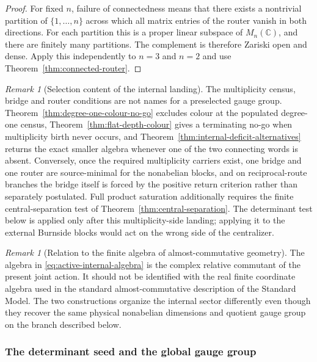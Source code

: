 \documentclass[11pt]{article}
\theoremstyle{definition}
\theoremstyle{remark}
\newtheorem{remark}[theorem]{Remark}
\newcommand{\C}{\mathbb C}
\begin{document}
\begin{proof}
For fixed $n$, failure of connectedness means that there exists a nontrivial
partition of $\{1,\ldots,n\}$ across which all matrix entries of the router
vanish in both directions.  For each partition this is a proper linear
subspace of $M_n(\C)$, and there are finitely many partitions.  The complement
is therefore Zariski open and dense.  Apply this independently to $n=3$ and
$n=2$ and use Theorem~\ref{thm:connected-router}.
\end{proof}

\begin{remark}[Selection content of the internal landing]
The multiplicity census, bridge and router conditions are not names for a
preselected gauge group.  Theorem~\ref{thm:degree-one-colour-no-go} excludes
colour at the populated degree-one census,
Theorem~\ref{thm:flat-depth-colour} gives a terminating no-go when multiplicity
birth never occurs, and Theorem~\ref{thm:internal-deficit-alternatives} returns
the exact smaller algebra whenever one of the two connecting words is absent.
Conversely, once the required multiplicity carriers exist, one bridge and one
router are source-minimal for the nonabelian blocks, and on reciprocal-route
branches the bridge itself is forced by the positive return criterion rather
than separately postulated.  Full product saturation additionally requires the
finite central-separation test of Theorem~\ref{thm:central-separation}.  The
determinant test below is applied only after this multiplicity-side landing;
applying it to the external Burnside blocks would act on the wrong side of the
centralizer.
\end{remark}

\begin{remark}[Relation to the finite algebra of almost-commutative geometry]
The algebra in \eqref{eq:active-internal-algebra} is the complex relative
commutant of the present joint action.  It should not be identified with the
real finite coordinate algebra used in the standard almost-commutative
description of the Standard Model.  The two constructions organize the
internal sector differently even though they recover the same physical
nonabelian dimensions and quotient gauge group on the branch described below.
\end{remark}

\subsubsection{The determinant seed and the global gauge group}
\end{document}
